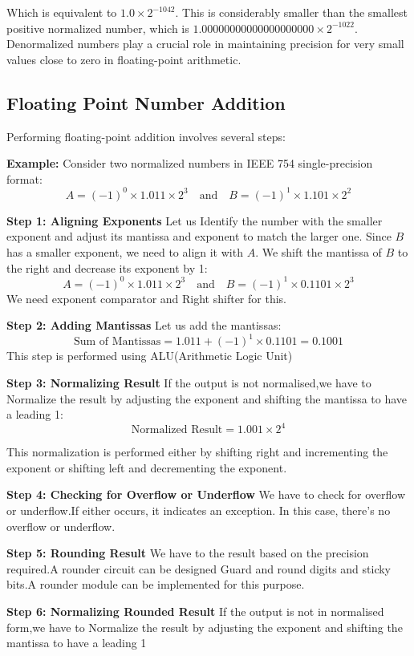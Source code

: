 \documentclass[12pt]{article}
\begin{document}
Which is equivalent to \(1.0 \times 2^{-1042}\). This is considerably smaller than the smallest positive normalized number, which is \(1.0000 0000 0000 0000 0000 \times 2^{-1022}\). Denormalized numbers play a crucial role in maintaining precision for very small values close to zero in floating-point arithmetic.

\subsection{Floating Point Number Addition}


Performing floating-point addition involves several steps:

\textbf{Example:}
Consider two normalized numbers in IEEE 754 single-precision format:
\[
A = (-1)^0 \times 1.011 \times 2^3 \quad \text{and} \quad B = (-1)^1 \times 1.101 \times 2^2
\]

\textbf{Step 1: Aligning Exponents}
Let us Identify the number with the smaller exponent and adjust its mantissa and exponent to match the larger one. Since \( B \) has a smaller exponent, we need to align it with \( A \). We shift the mantissa of \( B \) to the right and decrease its exponent by 1:
\[
A = (-1)^0 \times 1.011 \times 2^3 \quad \text{and} \quad B = (-1)^1 \times 0.1101 \times 2^3
\]
We need exponent comparator and Right shifter for this.

\textbf{Step 2: Adding  Mantissas}
Let us add the mantissas:
\[
\text{Sum of Mantissas} = 1.011 + (-1)^1 \times 0.1101 = 0.1001
\]
This step is performed using ALU(Arithmetic Logic Unit)

\textbf{Step 3: Normalizing Result}
If the output is not normalised,we have to  Normalize the result by adjusting the exponent and shifting the mantissa to have a leading 1:
\[
\text{Normalized Result} = 1.001 \times 2^4
\]

This normalization is performed either by shifting right and incrementing the exponent or shifting left and decrementing the exponent.

\textbf{Step 4: Checking for Overflow or Underflow}
We have to check for overflow or underflow.If either occurs, it indicates an exception.
In this case, there's no overflow or underflow.

\textbf{Step 5: Rounding Result}
We have to the result based on the precision required.A rounder circuit can be designed Guard and round digits and sticky bits.A rounder module can be implemented for this purpose.

\textbf{Step 6: Normalizing Rounded Result}
If the output is not in normalised form,we have to  Normalize the result by adjusting the exponent and shifting the mantissa to have a leading 1
\end{document}
